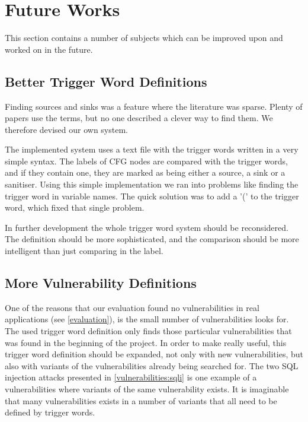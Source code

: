 \section{Future Works}
This section contains a number of subjects which can be improved upon and worked on in the future.

\subsection{Better Trigger Word Definitions}
Finding sources and sinks was a feature where the literature was sparse.
Plenty of papers use the terms, but no one described a clever way to find them.
We therefore devised our own system.

The implemented system uses a text file with the trigger words written in a very simple syntax.
The labels of CFG nodes are compared with the trigger words, and if they contain one, they are marked as being either a source, a sink or a sanitiser.
Using this simple implementation we ran into problems like finding the trigger word in variable names.
The quick solution was to add a '(' to the trigger word, which fixed that single problem.

In further development the whole trigger word system should be reconsidered.
The definition should be more sophisticated, and the comparison should be more intelligent than just comparing in the label.

\subsection{More Vulnerability Definitions}
One of the reasons that our evaluation found no vulnerabilities in real applications (see \cref{evaluation}), is the small number of vulnerabilities \pyt{} looks for.
The used trigger word definition only finds those particular vulnerabilities that was found in the beginning of the project.
In order to make \pyt{} really useful, this trigger word definition should be expanded, not only with new vulnerabilities, but also with variants of the vulnerabilities already being searched for.
The two SQL injection attacks presented in \cref{vulnerabilities:sqli} is one example of a vulnerabilities where variants of the same vulnerability exists.
It is imaginable that many vulnerabilities exists in a number of variants that all need to be defined by trigger words.

